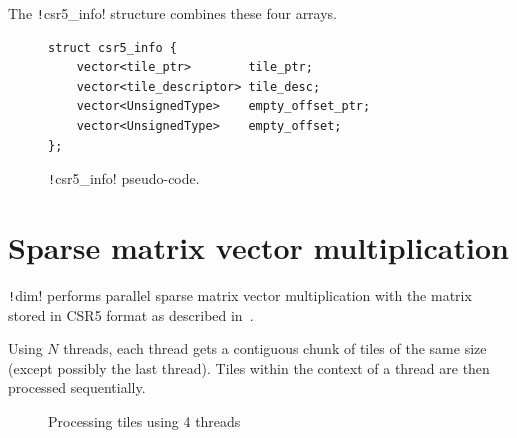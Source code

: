 \documentclass[thesis=M,english]{FITthesis}[2019/12/23]
\newcommand{\csre}[1]{\texttt!#1!}
\begin{document}
The \csre{csr5_info} structure combines these four arrays.


\begin{figure}[htp]
    \begin{verbatim}
struct csr5_info {
    vector<tile_ptr>        tile_ptr;
    vector<tile_descriptor> tile_desc;
    vector<UnsignedType>    empty_offset_ptr;
    vector<UnsignedType>    empty_offset;
};
    \end{verbatim}
    \caption{\csre{csr5_info} pseudo-code.}
\end{figure}


\section{Sparse matrix vector multiplication}\label{csr5:spmv}

\csre{dim} performs parallel sparse matrix vector multiplication with the matrix stored in CSR5 format
as described in~\cite{liu2015csr5}.

Using \(N\) threads, each thread gets a contiguous chunk of tiles of the same size (except possibly the
last thread). Tiles within the context of a thread are then processed sequentially.

\begin{figure}[htp]
    \centering
    \caption{Processing tiles using 4 threads}\label{csr5:thr_dist}
\end{figure}
\end{document}
